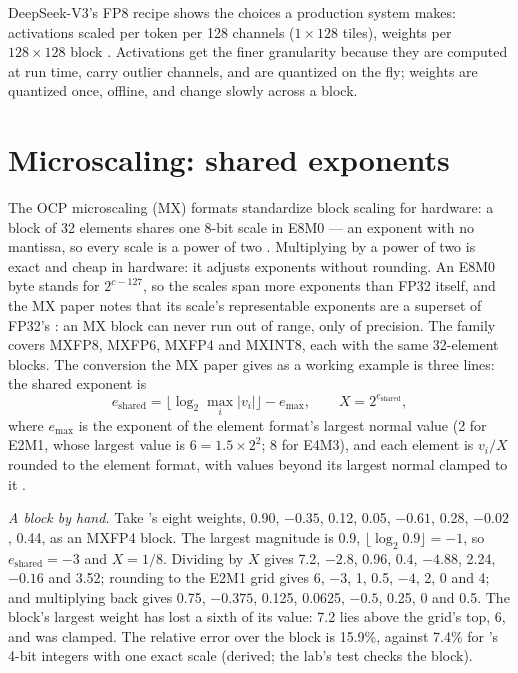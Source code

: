 DeepSeek-V3's FP8 recipe shows the choices a production system makes:
activations scaled per token per 128 channels ($1\times128$ tiles), weights per
$128\times128$ block \cite{deepseek2024v3}. Activations get the finer
granularity because they are computed at run time, carry outlier channels, and
are quantized on the fly; weights are quantized once, offline, and change
slowly across a block.

\section{Microscaling: shared exponents}

The OCP microscaling (MX) formats standardize block scaling for hardware: a
block of 32 elements shares one 8-bit scale in E8M0 --- an exponent with no
mantissa, so every scale is a power of two \cite{rouhani2023mx}. Multiplying by
a power of two is exact and cheap in hardware: it adjusts exponents without
rounding. An E8M0 byte stands for $2^{c-127}$, so the scales span more exponents
than FP32 itself, and the MX paper notes that its scale's representable
exponents are a superset of FP32's \cite{rouhani2023mx}: an MX block can never
run out of range, only of precision. The family covers MXFP8, MXFP6, MXFP4 and
MXINT8, each with the same 32-element blocks. The conversion the MX paper gives as a working example is
three lines: the shared exponent is
\begin{equation}
e_{\text{shared}} = \lfloor \log_2 \max_i \lvert v_i \rvert \rfloor - e_{\max},
\qquad X = 2^{e_{\text{shared}}},
\label{eq:mx-exponent}
\end{equation}
where $e_{\max}$ is the exponent of the element format's largest normal value
(2 for E2M1, whose largest value is $6 = 1.5 \times 2^2$; 8 for E4M3), and each
element is $v_i / X$ rounded to the element format, with values beyond its
largest normal clamped to it \cite[Algorithm~1]{rouhani2023mx}.

\emph{A block by hand.} Take 's eight weights, 0.90,
$-0.35$, 0.12, 0.05, $-0.61$, 0.28, $-0.02$, 0.44, as an MXFP4 block. The largest
magnitude is 0.9, $\lfloor \log_2 0.9 \rfloor = -1$, so $e_{\text{shared}} = -3$ and
$X = 1/8$. Dividing by $X$ gives 7.2, $-2.8$, 0.96, 0.4, $-4.88$, 2.24, $-0.16$ and
3.52; rounding to the E2M1 grid gives 6, $-3$, 1, 0.5, $-4$, 2, 0 and 4; and
multiplying back gives 0.75, $-0.375$, 0.125, 0.0625, $-0.5$, 0.25, 0 and 0.5.
The block's largest weight has lost a sixth of its value: 7.2 lies above the
grid's top, 6, and was clamped. The relative error over the block is 15.9\%,
against 7.4\% for 's 4-bit integers with one exact
scale (derived; the lab's test checks the block).

